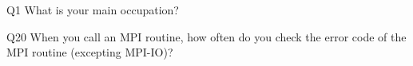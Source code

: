 \begin{description}%
\item{Q1} What is your main occupation?%
\item{Q20} When you call an MPI routine, how often do you check the error code of the MPI routine  (excepting MPI-IO)?%
\end{description}%
